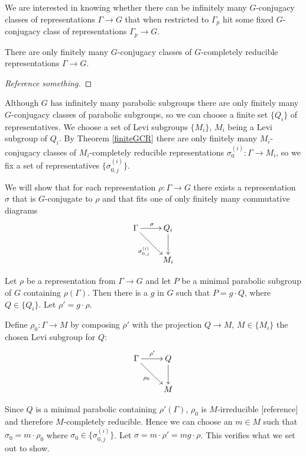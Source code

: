 We are interested in knowing whether there can be infinitely many $G$-conjugacy classes of representations $\Gamma\rightarrow G$ that when restricted to $\Gamma_p$ hit some fixed $G$-conjugacy class of representations $\Gamma_p\rightarrow G$. 

\begin{theorem} \label{finiteGCR} There are only finitely many $G$-conjugacy classes of $G$-completely reducible representations $\Gamma\rightarrow G$.
\end{theorem}
\begin{proof}[Reference something]
\end{proof}

Although $G$ has infinitely many parabolic subgroups there are only finitely many $G$-conjugacy classes of parabolic subgroups, so we can choose a finite set $\{Q_i\}$ of representatives. We choose a set of Levi subgroups $\{M_i\}$, $M_i$ being a Levi subgroup of $Q_i$. By Theorem \ref{finiteGCR} there are only finitely many $M_i$-conjugacy classes of $M_i$-completely reducible representations $\sigma^{(i)}_0:\Gamma\rightarrow M_i$, so we fix a set of representatives $\{\sigma^{(i)}_{0,j}\}$.

We will show that for each representation $\rho:\Gamma\rightarrow G$ there exists a representation $\sigma$ that is $G$-conjugate to $\rho$ and that fits one of only finitely many commutative diagrams
\begin{displaymath}
	\xymatrix{
	\Gamma \ar[r]^{\sigma} \ar[rd]_{\sigma^{(i)}_{0,j}} & Q_i \ar[d]\\
	& M_i}
\end{displaymath}

Let $\rho$ be a representation from $\Gamma\rightarrow G$ and let $P$ be a minimal parabolic subgroup of $G$ containing $\rho(\Gamma)$. Then there is a $g$ in $G$ such that $P = g\cdot Q$, where $Q\in\{Q_i\}$. Let $\rho' = g\cdot \rho$. 

Define $\rho_0:\Gamma\rightarrow M$ by composing $\rho'$ with the projection $Q\rightarrow M$, $M\in\{M_i\}$ the chosen Levi subgroup for $Q$:
\begin{displaymath}
	\xymatrix{
	\Gamma \ar[r]^{\rho'} \ar[rd]_{\rho_0} & Q \ar[d]\\
	& M}
\end{displaymath}

Since $Q$ is a minimal parabolic containing $\rho'(\Gamma)$, $\rho_0$ is $M$-irreducible [reference] and therefore $M$-completely reducible. Hence we can choose an $m\in M$ such that $\sigma_0 = m\cdot \rho_0$ where $\sigma_0\in\{\sigma^{(i)}_{0,j}\}$. Let $\sigma = m\cdot \rho' = mg\cdot \rho$. This verifies what we set out to show.

